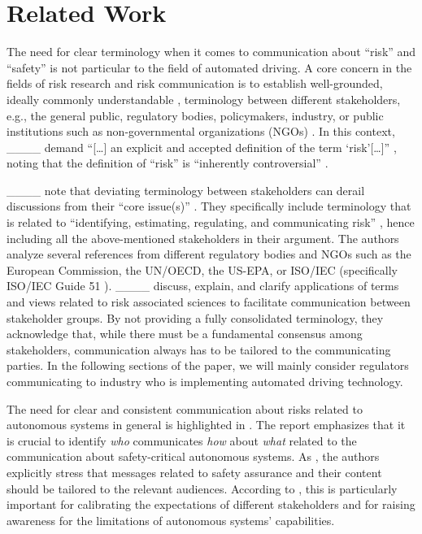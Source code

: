 \section{Related Work}
\label{sec:related-work}
The need for clear terminology when it comes to communication about ``risk'' and ``safety'' is not particular to the field of automated driving.
A core concern in the fields of risk research and risk communication \parencite{renn1998} is to establish well-grounded, ideally commonly understandable \parencite{sellnow2009}, terminology between different stakeholders, e.g., the general public, regulatory bodies, policymakers, industry, or public institutions such as non-governmental organizations (NGOs) \parencite{fischhoff1984,renn1998,christensen2003}.
In this context, ____ demand ``[\ldots] an explicit and accepted definition of the term `risk'[\ldots]'' \parencite[123]{fischhoff1984}, noting that the definition of ``risk'' is ``inherently controversial'' \parencite[124]{fischhoff1984}.

____ note that deviating terminology between stakeholders can derail discussions from their ``core issue(s)'' \parencite[182]{christensen2003}.
They specifically include terminology that is related to ``identifying, estimating, regulating, and communicating risk'' \parencite[182]{christensen2003}, hence including all the above-mentioned stakeholders in their argument.
The authors analyze several references from different regulatory bodies and NGOs such as the European Commission, the UN/OECD, the US-EPA, or ISO/IEC (specifically ISO/IEC Guide 51 \parencite{iso51}).
____ \parencite{christensen2003} discuss, explain, and clarify applications of terms and views related to risk associated sciences to facilitate communication between stakeholder groups.
By not providing a fully consolidated terminology, they acknowledge that, while there must be a fundamental consensus among stakeholders, communication always has to be tailored to the communicating parties.
In the following sections of the paper, we will mainly consider regulators communicating to industry who is implementing automated driving technology.

The need for clear and consistent communication about risks related to autonomous systems in general is highlighted in \parencite{wmg2023}.
The report emphasizes that it is crucial to identify \emph{who} communicates \emph{how} about \emph{what} related to the communication about safety-critical autonomous systems.
As \parencite{christensen2003}, the authors explicitly stress that messages related to safety assurance and their content should be tailored to the relevant audiences.
According to \parencite{wmg2023}, this is particularly important for calibrating the expectations of different stakeholders and for raising awareness for the limitations of autonomous systems' capabilities.

